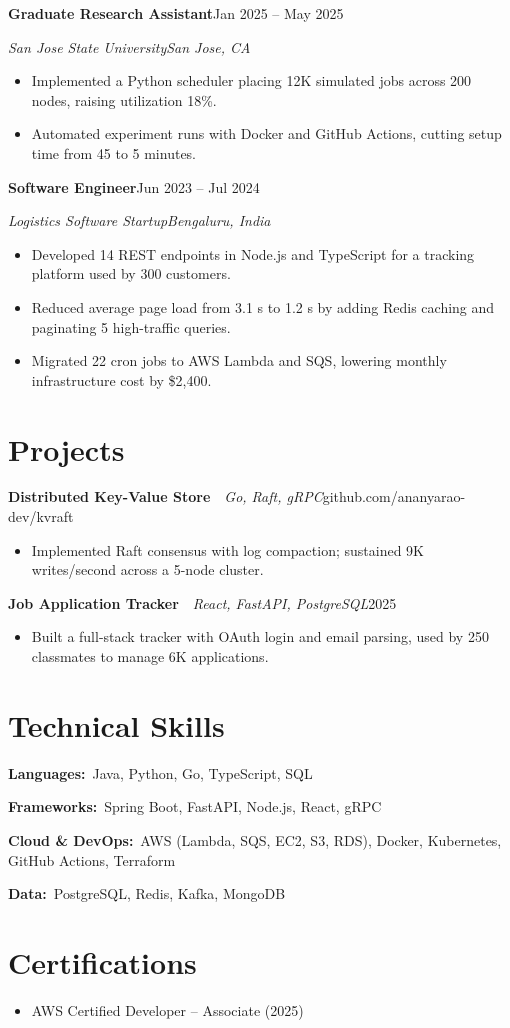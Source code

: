 \documentclass[letterpaper,11pt]{article}
\newcommand{\rRole}[4]{%
  \vspace{2pt}%
  \noindent\textbf{#1}\hfill#4\par
  \noindent\textit{#2}\hfill\textit{#3}\par
  \vspace{1pt}%
}
\newcommand{\rProject}[3]{%
  \vspace{2pt}%
  \noindent\textbf{#1}\ \textbar\ \textit{#2}\hfill#3\par
  \vspace{1pt}%
}
\newcommand{\rSkill}[2]{\noindent\textbf{#1:}\ #2\par\vspace{1pt}}
\newenvironment{rBullets}
  {\begin{itemize}[leftmargin=14pt,itemsep=0.5pt,parsep=0pt,topsep=2pt,
                   partopsep=0pt,label=\textbullet]}
  {\end{itemize}}
\begin{document}
\rRole{Graduate Research Assistant}{San Jose State University}{San Jose, CA}{Jan 2025 -- May 2025}
\begin{rBullets}
  \item Implemented a Python scheduler placing 12K simulated jobs across 200 nodes, raising utilization 18\%.
  \item Automated experiment runs with Docker and GitHub Actions, cutting setup time from 45 to 5 minutes.
\end{rBullets}

\rRole{Software Engineer}{Logistics Software Startup}{Bengaluru, India}{Jun 2023 -- Jul 2024}
\begin{rBullets}
  \item Developed 14 REST endpoints in Node.js and TypeScript for a tracking platform used by 300 customers.
  \item Reduced average page load from 3.1 s to 1.2 s by adding Redis caching and paginating 5 high-traffic queries.
  \item Migrated 22 cron jobs to AWS Lambda and SQS, lowering monthly infrastructure cost by \$2,400.
\end{rBullets}

\section{Projects}

\rProject{Distributed Key-Value Store}{Go, Raft, gRPC}{github.com/ananyarao-dev/kvraft}
\begin{rBullets}
  \item Implemented Raft consensus with log compaction; sustained 9K writes/second across a 5-node cluster.
\end{rBullets}

\rProject{Job Application Tracker}{React, FastAPI, PostgreSQL}{2025}
\begin{rBullets}
  \item Built a full-stack tracker with OAuth login and email parsing, used by 250 classmates to manage 6K applications.
\end{rBullets}

\section{Technical Skills}
\rSkill{Languages}{Java, Python, Go, TypeScript, SQL}
\rSkill{Frameworks}{Spring Boot, FastAPI, Node.js, React, gRPC}
\rSkill{Cloud \& DevOps}{AWS (Lambda, SQS, EC2, S3, RDS), Docker, Kubernetes, GitHub Actions, Terraform}
\rSkill{Data}{PostgreSQL, Redis, Kafka, MongoDB}

\section{Certifications}
\begin{rBullets}
  \item AWS Certified Developer -- Associate (2025)
\end{rBullets}
\end{document}
